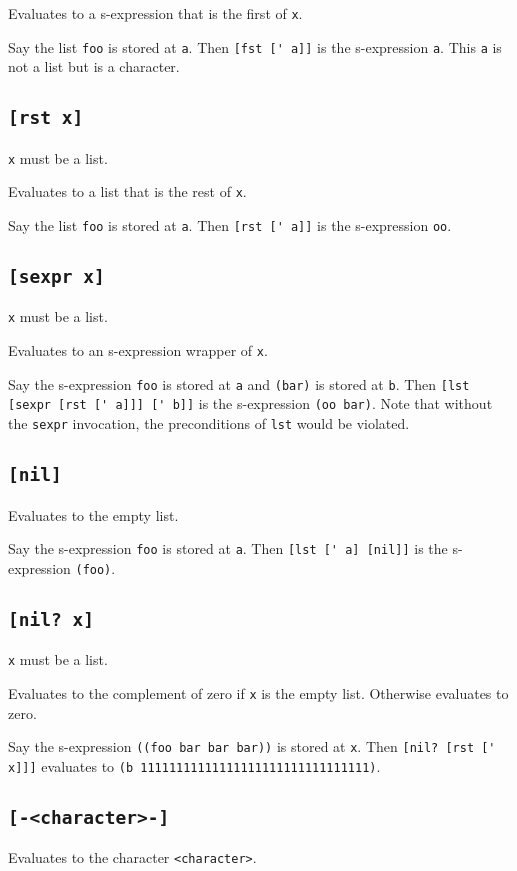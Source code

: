\documentclass[twocolumn,landscape]{article}
\begin{document}
      Evaluates to a s-expression that is the first of \lstinline{x}.

      Say the list \lstinline{foo} is stored at \lstinline{a}. Then \lstinline{[fst [' a]]} is the s-expression \lstinline{a}. This \lstinline{a} is not a list but is a character.
    \subsection{\lstinline{[rst x]}}
      \lstinline{x} must be a list.

      Evaluates to a list that is the rest of \lstinline{x}.

      Say the list \lstinline{foo} is stored at \lstinline{a}. Then \lstinline{[rst [' a]]} is the s-expression \lstinline{oo}.
    \subsection{\lstinline{[sexpr x]}}
      \lstinline{x} must be a list.

      Evaluates to an s-expression wrapper of \lstinline{x}.

      Say the s-expression \lstinline{foo} is stored at \lstinline{a} and \lstinline{(bar)} is stored at \lstinline{b}. Then \lstinline{[lst [sexpr [rst [' a]]] [' b]]} is the s-expression \lstinline{(oo bar)}. Note that without the \lstinline{sexpr} invocation, the preconditions of \lstinline{lst} would be violated.
    \subsection{\lstinline{[nil]}}
      Evaluates to the empty list.

      Say the s-expression \lstinline{foo} is stored at \lstinline{a}. Then \lstinline{[lst [' a] [nil]]} is the s-expression \lstinline{(foo)}.
    \subsection{\lstinline{[nil? x]}}
      \lstinline{x} must be a list.

      Evaluates to the complement of zero if \lstinline{x} is the empty list. Otherwise evaluates to zero.

      Say the s-expression \lstinline{((foo bar bar bar))} is stored at \lstinline{x}. Then \lstinline{[nil? [rst [' x]]]} evaluates to \lstinline{(b 11111111111111111111111111111111)}.
    \subsection{\lstinline{[-<character>-]}}
      Evaluates to the character \lstinline{<character>}.
\end{document}

